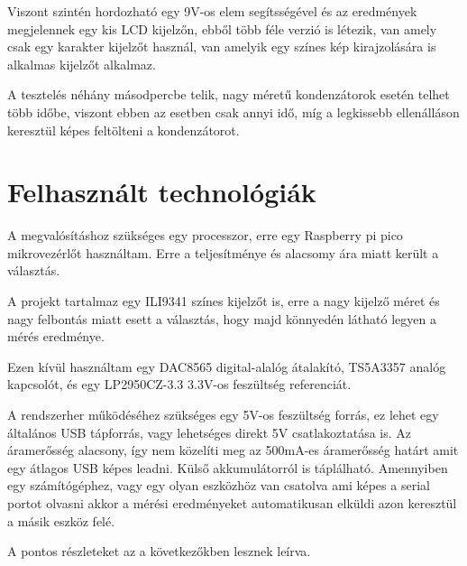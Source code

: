 Viszont szintén hordozható egy 9V-os elem segítsségével és az eredmények megjelennek egy
kis LCD kijelzőn, ebből több féle verzió is létezik, van amely csak egy karakter kijelzőt
használ, van amelyik egy színes kép kirajzolására is alkalmas kijelzőt alkalmaz. 

A tesztelés néhány másodpercbe telik, nagy méretű kondenzátorok esetén telhet több időbe,
viszont ebben az esetben csak annyi idő, míg a legkissebb ellenálláson keresztül képes feltölteni
a kondenzátorot.


\section{Felhasznált technológiák}

A megvalósításhoz szükséges egy processzor, erre egy Raspberry pi pico \cite{RaspberryPico} 
mikrovezérlőt használtam. Erre a teljesítménye és alacsomy ára miatt került a választás.


A projekt tartalmaz egy ILI9341 \cite{ILI9341Datasheet} színes kijelzőt is, erre a nagy kijelző méret és 
nagy felbontás miatt esett a választás, hogy majd könnyedén látható legyen a mérés eredménye.

Ezen kívül használtam egy DAC8565 digital-alalóg átalakító, TS5A3357 analóg kapcsolót, és egy LP2950CZ-3.3
3.3V-os feszültség referenciát.

A rendszerher működéséhez szükséges egy 5V-os feszültség forrás, ez lehet egy általános USB
tápforrás, vagy lehetséges direkt 5V csatlakoztatása is. Az áramerősség alacsony, így nem közelíti
meg az 500mA-es áramerősség határt amit egy átlagos USB képes leadni. Külső akkumulátorról
is táplálható. Amennyiben egy számítógéphez, vagy egy olyan eszközhöz van csatolva ami képes 
a serial portot olvasni akkor a mérési eredményeket automatikusan elküldi azon keresztül a 
másik eszköz felé. 

A pontos részleteket az a következőkben lesznek leírva.

